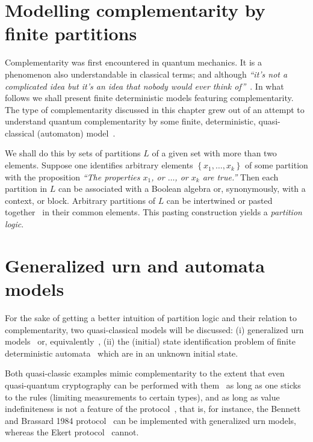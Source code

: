 \section{Modelling complementarity by finite partitions}

Complementarity was first encountered in quantum mechanics.
It is a phenomenon also understandable in classical terms; and although
{\em ``it's not a complicated idea but
it's an idea that nobody would ever think of''}~\cite{Bennett-IBM-03.05.2016}.
In what follows we shall present finite deterministic models featuring complementarity.
The type of complementarity discussed in this chapter grew out of an attempt to understand quantum complementarity by some finite, deterministic,
quasi-classical (automaton) model~\cite{e-f-moore}.


We shall do this by sets of partitions $L$ of a given set with more than two elements.
Suppose one identifies arbitrary elements $\left\{ x_1, \ldots , x_k \right\}$ of some partition with the proposition
{\em ``The properties $x_1$, or $\ldots$, or $x_k$ are true.''}
Then each partition in $L$ can be associated with a Boolean algebra or, synonymously, with a context, or block.
Arbitrary partitions of $L$ can be intertwined or pasted together~\cite{greechie:71,kalmbach-83,nav:91,harding-navara-subalgebras}
in their common elements.
This pasting construction yields a
{\em partition logic}.




\section{Generalized urn and automata models}


For the sake of getting a better intuition of partition logic and their relation to complementarity,
two quasi-classical models will be discussed:
(i)
generalized urn models~\cite{wright,wright:pent} or,
equivalently~\cite{svozil-2001-eua,svozil-2008-ql},
(ii)
the (initial) state identification problem
of finite deterministic automata~\cite{e-f-moore,svozil-93,schaller-96,dvur-pul-svo,cal-sv-yu}
which are in an unknown initial state.

Both quasi-classic examples mimic complementarity to the extent that even quasi-quantum cryptography
can be performed with them~\cite{svozil-2005-ln1e} as long as one sticks to the rules (limiting measurements to certain types),
and as long as value indefiniteness is not a feature of the protocol~\cite{PhysRevLett.85.3313,2010-qchocolate},
that is, for instance,
the Bennett and  Brassard 1984 protocol~\cite{benn-92} can be implemented with generalized urn models,
whereas the Ekert protocol~\cite{ekert91} cannot.


